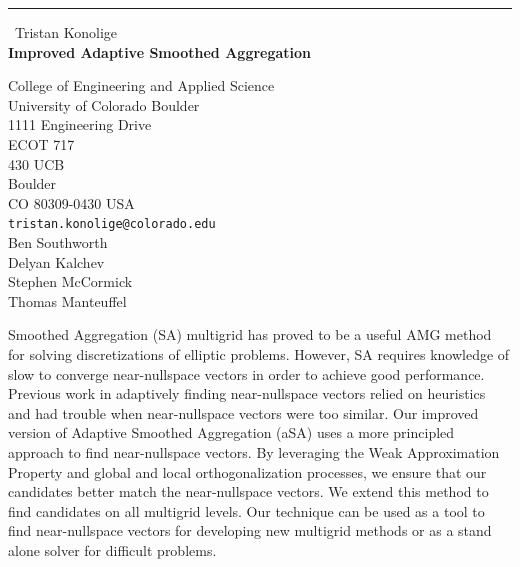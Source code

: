 \documentclass{report}
\begin{document}
\begin{center}
\rule{6in}{1pt} \
{\large Tristan Konolige \\
{\bf Improved Adaptive Smoothed Aggregation}}

College of Engineering and Applied Science \\ University of Colorado Boulder \\ 1111 Engineering Drive \\ ECOT 717 \\ 430 UCB \\ Boulder \\ CO 80309-0430 USA
\\
{\tt tristan.konolige@colorado.edu}\\
Ben Southworth\\
Delyan Kalchev\\
Stephen McCormick\\
Thomas Manteuffel\end{center}

Smoothed Aggregation (SA) multigrid has proved to be a useful AMG method
for solving discretizations of elliptic problems. However, SA requires
knowledge of slow to converge near-nullspace vectors in order to achieve
good performance. Previous work in adaptively finding near-nullspace
vectors relied on heuristics and had trouble when near-nullspace vectors
were too similar. Our improved version of Adaptive Smoothed Aggregation
(aSA) uses a more principled approach to find near-nullspace vectors. By
leveraging the Weak Approximation Property and global and local
orthogonalization processes, we ensure that our candidates better match
the near-nullspace vectors. We extend this method to find candidates on
all multigrid levels. Our technique can be used as a tool to find
near-nullspace vectors for developing new multigrid methods or as a stand
alone solver for difficult problems.
\end{document}
